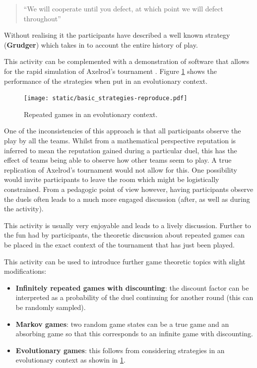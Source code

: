 \documentclass{article}
\begin{document}
\begin{quote}
   ``We will cooperate until you defect, at which point we will defect
throughout''
\end{quote}

Without realising it the participants have described a well known strategy
(\textbf{Grudger}) which takes in to account the entire history of play.

This activity can be complemented with a demonstration of software that allows
for the rapid simulation of Axelrod's tournament
\cite{Axelrod-Pythonprojectteam2015}. Figure \ref{fig:evolutionary_axelrod}
shows the performance of the strategies when put in an evolutionary context.

\begin{figure}[!hbtp]
    \centering
    \texttt{[image: static/basic\_strategies-reproduce.pdf]}
    \caption{Repeated games in an evolutionary context.}
    \label{fig:evolutionary_axelrod}
\end{figure}

One of the inconsistencies of this approach is that all participants observe the
play by all the teams. Whilst from a mathematical perspective reputation is
inferred to mean the reputation gained during a particular duel, this has the
effect of teams being able to observe how other teams seem to play. A true
replication of Axelrod's tournament would not allow for this. One possibility
would invite participants to leave the room which might be logistically
constrained. From a pedagogic point of view however, having participants observe
the duels often leads to a much more engaged discussion (after, as well as during
the activity).

This activity is usually very enjoyable and leads to a lively discussion.
Further to the fun had by participants, the theoretic discussion about repeated
games can be placed in the exact context of the tournament that has just been
played.

This activity can be used to introduce further game theoretic topics with
slight modifications:

\begin{itemize}
    \item \textbf{Infinitely repeated games with discounting}: the discount
        factor can be interpreted as a probability of the duel continuing for
        another round (this can be randomly sampled).
    \item \textbf{Markov games}: two random game states can be a true game
        and an absorbing game so that this corresponds to an infinite game with
        discounting.
    \item \textbf{Evolutionary games}: this follows from considering strategies
        in an evolutionary context as showin in \ref{fig:evolutionary_axelrod}.
\end{itemize}
\end{document}
